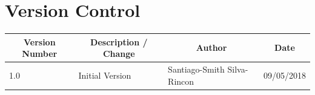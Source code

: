\documentclass[a4paper,12pt]{book}
\makeatletter
\def\cleardoublepage{\clearpage\if@twoside \ifodd\c@page\else%
  \hbox{}%
  \thispagestyle{empty}%
  \newpage%
  \if@twocolumn\hbox{}\newpage\fi\fi\fi}
\theoremstyle{break}
\makeatother
\begin{document}
\frontmatter

\chapter*{Version Control}
\begin{table}[!h]
\centering
\label{my-label}
\begin{tabular}{|l|l|l|l|}
\hline
\multicolumn{1}{|c|}{\textbf{Version Number}} & \multicolumn{1}{c|}{\textbf{Description / Change}} & \multicolumn{1}{c|}{\textbf{Author}} & \multicolumn{1}{c|}{\textbf{Date}} \\ \hline
1.0                                           & Initial Version                                    & Santiago-Smith Silva-Rincon          & 09/05/2018                         \\ \hline
\end{tabular}
\end{table}

\clearpage
\tableofcontents

\clearpage

\clearpage


\mainmatter
\pagestyle{fancy}

\cleardoublepage


% 
% 
% 
% 
% 
% 
% 

\clearpage


\thispagestyle{empty}
\end{document}
